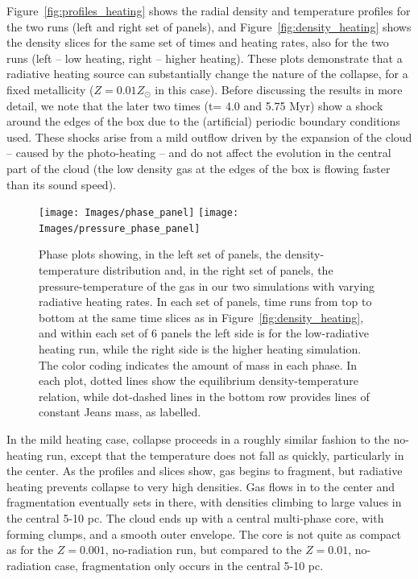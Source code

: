 \documentclass[useAMS,usenatbib]{mn2e}
\begin{document}

Figure~\ref{fig:profiles_heating} shows the radial density and temperature profiles for the two runs (left and right set of panels), and Figure~\ref{fig:density_heating} shows the density slices for the same set of times and heating rates, also for the two runs (left -- low heating, right -- higher heating).  These plots demonstrate that a radiative heating source can substantially change the nature of the collapse, for a fixed metallicity ($Z=0.01 Z_\odot$ in this case).   Before discussing the results in more detail, we note that the later two times (t= 4.0 and 5.75 Myr) show a shock around the edges of the box due to the (artificial) periodic boundary conditions used.   These shocks arise from a mild outflow driven by the expansion of the cloud -- caused by the photo-heating -- and do not affect the evolution in the central part of the cloud (the low density gas at the edges of the box is flowing faster than its sound speed).

\begin{figure}
\begin{center}
\hspace{-1.2cm}
\texttt{[image: Images/phase\_panel]} \hspace{-1cm}
\texttt{[image: Images/pressure\_phase\_panel]}
\end{center}
\caption{\label{fig:phase_panels} Phase plots showing, in the left set of panels, the density-temperature distribution and, in the right set of panels, the pressure-temperature of the gas in our two simulations with varying radiative heating rates.   In each set of panels, time runs from top to bottom at the same time slices as in Figure~\ref{fig:density_heating}, and within each set of 6 panels the left side is for the low-radiative heating run, while the right side is the higher heating simulation.  The color coding indicates the amount of mass in each phase.   In each plot, dotted lines show the equilibrium density-temperature relation, while dot-dashed lines in the bottom row provides lines of constant Jeans mass, as labelled.}
\end{figure}

In the mild heating case, collapse proceeds in a roughly similar fashion to the no-heating run, except that the temperature does not fall as quickly, particularly in the center.  As the profiles and slices show, gas begins to fragment, but radiative heating prevents collapse to very high densities.  Gas flows in to the center and fragmentation eventually sets in there, with densities climbing to large values in the central 5-10 pc.  The cloud ends up with a central multi-phase core, with forming clumps, and a smooth outer envelope.  The core is not quite as compact as for the $Z=0.001$, no-radiation run, but compared to the $Z=0.01$, no-radiation case, fragmentation only occurs in the central 5-10 pc.
\end{document}
